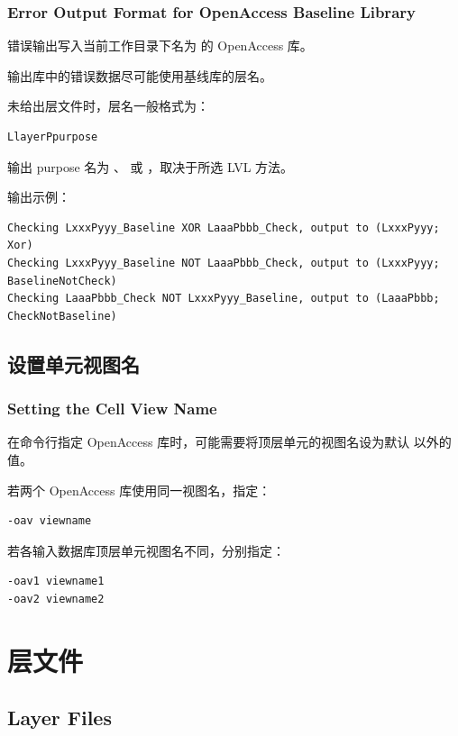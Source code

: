 \subsubsection*{Error Output Format for OpenAccess Baseline Library}

错误输出写入当前工作目录下名为  的 OpenAccess 库。

输出库中的错误数据尽可能使用基线库的层名。

未给出层文件时，层名一般格式为：
\begin{lstlisting}
LlayerPpurpose
\end{lstlisting}

输出 purpose 名为 、 或 ，取决于所选 LVL 方法。

输出示例：
\begin{lstlisting}
Checking LxxxPyyy_Baseline XOR LaaaPbbb_Check, output to (LxxxPyyy; Xor)
Checking LxxxPyyy_Baseline NOT LaaaPbbb_Check, output to (LxxxPyyy; BaselineNotCheck)
Checking LaaaPbbb_Check NOT LxxxPyyy_Baseline, output to (LaaaPbbb; CheckNotBaseline)
\end{lstlisting}

\subsection{设置单元视图名}
\subsubsection*{Setting the Cell View Name}

在命令行指定 OpenAccess 库时，可能需要将顶层单元的视图名设为默认  以外的值。

若两个 OpenAccess 库使用同一视图名，指定：
\begin{lstlisting}
-oav viewname
\end{lstlisting}

若各输入数据库顶层单元视图名不同，分别指定：
\begin{lstlisting}
-oav1 viewname1
-oav2 viewname2
\end{lstlisting}

\section{层文件}
\subsection*{Layer Files}

